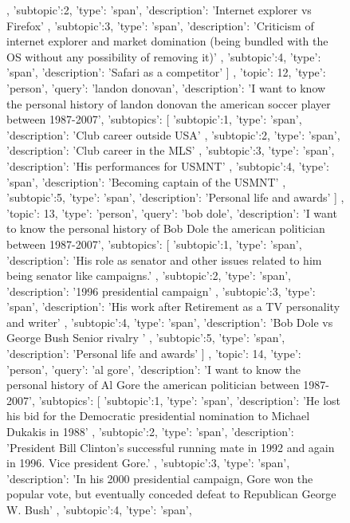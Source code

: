 \begin{figure}[ht]
{\begin{minipage}{\textwidth}
{{			},
			{
				'subtopic':2,
				'type': 'span',
				'description': 'Internet explorer vs Firefox'
			},
			{
				'subtopic':3,
				'type': 'span',
				'description': 'Criticism of internet explorer and market domination (being bundled with the OS without any possibility of removing it)'
			},
			{
				'subtopic':4,
				'type': 'span',
				'description': 'Safari as a competitor'
			}
		]
	},
	{	
		'topic': 12,
		'type': 'person',
		'query': 'landon donovan',
		'description': 'I want to know the personal history of landon donovan the american soccer player between 1987-2007',
		'subtopics': [
			{
				'subtopic':1,
				'type': 'span',
				'description': 'Club career outside USA'
			},
			{
				'subtopic':2,
				'type': 'span',
				'description': 'Club career in the MLS'
			},
			{
				'subtopic':3,
				'type': 'span',
				'description': 'His performances for USMNT'
			},
			{
				'subtopic':4,
				'type': 'span',
				'description': 'Becoming captain of the USMNT'
			},
			{
				'subtopic':5,
				'type': 'span',
				'description': 'Personal life and awards'
			}
		]
	},
	{	
		'topic': 13,
		'type': 'person',
		'query': 'bob dole',
		'description': 'I want to know the personal history of Bob Dole the american politician between 1987-2007',
		'subtopics': [
			{
				'subtopic':1,
				'type': 'span',
				'description': 'His role as senator and other issues related to him being senator like campaigns.'
			},
			{
				'subtopic':2,
				'type': 'span',
				'description': '1996 presidential campaign'
			},
			{
				'subtopic':3,
				'type': 'span',
				'description': 'His work after Retirement as a TV personality and writer'
			},
			{
				'subtopic':4,
				'type': 'span',
				'description': 'Bob Dole vs George Bush Senior rivalry '
			},
			{
				'subtopic':5,
				'type': 'span',
				'description': 'Personal life and awards'
			}
		]
	},
	{	
		'topic': 14,
		'type': 'person',
		'query': 'al gore',
		'description': 'I want to know the personal history of Al Gore the american politician between 1987-2007',
		'subtopics': [
			{
				'subtopic':1,
				'type': 'span',
				'description': 'He lost his bid for the Democratic presidential nomination to Michael Dukakis in 1988'
			},
			{
				'subtopic':2,
				'type': 'span',
				'description': 'President Bill Clinton's successful running mate in 1992 and again in 1996. Vice president Gore.'
			},
			{
				'subtopic':3,
				'type': 'span',
				'description': 'In his 2000 presidential campaign, Gore won the popular vote, but eventually conceded defeat to Republican George W. Bush'
			},
			{
				'subtopic':4,
				'type': 'span',
}}
\end{minipage}}
\end{figure}
